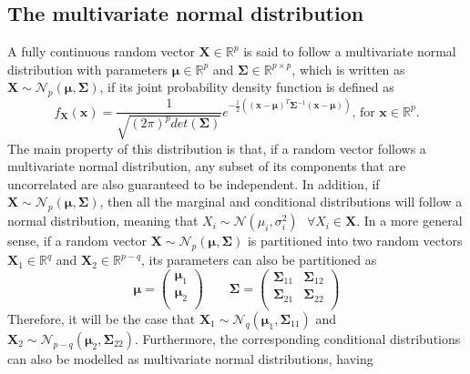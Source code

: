 \documentclass{report}
\begin{document}
\subsection{The multivariate normal distribution}
A fully continuous random vector $\displaystyle \mathbf{X} \in \mathbb{R}^p$ is said to follow a multivariate normal distribution with parameters $\displaystyle \mathbf{\mu} \in \mathbb{R}^p$ and $\displaystyle \mathbf{\Sigma} \in \mathbb{R}^{p \times p}$, which is written as $\displaystyle \mathbf{X} \sim \mathcal{N}_p(\mathbf{\mu}, \mathbf{\Sigma})$, if its joint probability density function is defined as
\[f_{\mathbf{X}}(\mathbf{x}) = \frac{1}{\sqrt{(2\pi)^pdet(\mathbf{\Sigma})}}e^{-\frac{1}{2}((\mathbf{x} - \mathbf{\mu})^T\mathbf{\Sigma}^{-1}(\mathbf{x} - \mathbf{\mu}))} \text{, for $\mathbf{x} \in \mathbb{R}^p$.}\]
The main property of this distribution is that, if a random vector follows a multivariate normal distribution, any subset of its components that are uncorrelated are also guaranteed to be independent. \newline
In addition, if $\displaystyle \mathbf{X} \sim \mathcal{N}_p(\mathbf{\mu}, \mathbf{\Sigma})$, then all the marginal and conditional distributions will follow a normal distribution, meaning that $\displaystyle X_i \sim \mathcal{N}(\mu_i, \sigma_i^2) \text{ } \forall X_i \in \mathbf{X}$. \newline
In a more general sense, if a random vector $\displaystyle \mathbf{X} \sim \mathcal{N}_p(\mathbf{\mu}, \mathbf{\Sigma})$ is partitioned into two random vectors $\displaystyle \mathbf{X}_1 \in \mathbb{R}^q$ and $\displaystyle \mathbf{X}_2 \in \mathbb{R}^{p - q}$, its parameters can also be partitioned as
\[\mathbf{\mu} = \begin{pmatrix}
    \mathbf{\mu}_1 \\
    \mathbf{\mu}_2 \\
\end{pmatrix} \quad\quad \mathbf{\Sigma} = \begin{pmatrix}
    \mathbf{\Sigma}_{11} & \mathbf{\Sigma}_{12} \\
    \mathbf{\Sigma}_{21} & \mathbf{\mathbf{\Sigma}}_{22} \\
\end{pmatrix}\]
Therefore, it will be the case that $\displaystyle \mathbf{X}_1 \sim \mathcal{N}_q(\mathbf{\mu}_1, \mathbf{\Sigma}_{11})$ and $\displaystyle \mathbf{X}_2 \sim \mathcal{N}_{p - q}(\mathbf{\mu}_2, \mathbf{\Sigma}_{22})$. \newline
Furthermore, the corresponding conditional distributions can also be modelled as multivariate normal distributions, having
\end{document}
